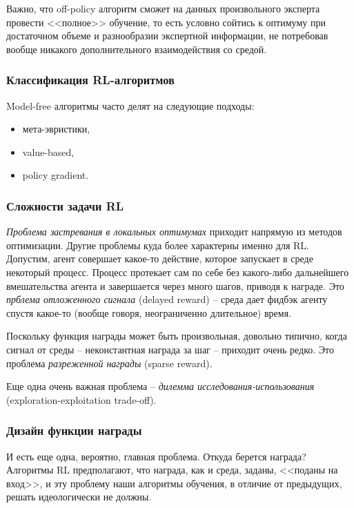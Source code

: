 \documentclass[%
	11pt,
	a4paper,
	utf8,
		]{article}
\begin{document}
Важно, что off-policy алгоритм сможет на данных произвольного эксперта провести <<полное>> обучение, то есть условно сойтись к оптимуму при достаточном объеме и разнообразии экспертной информации, не потребовав вообще никакого дополнительного взаимодействия со средой.

\subsubsection{Классификация RL-алгоритмов}

Model-free алгоритмы часто делят на следующие подходы:
\begin{itemize}
	\item мета-эвристики,
	
	\item value-based,
	
	\item policy gradient.
\end{itemize}

\subsubsection{Сложности задачи RL}

\emph{Проблема застревания в локальных оптимумах} приходит напрямую из методов оптимизации. Другие проблемы куда более характерны именно для RL. Допустим, агент совершает какое-то действие, которое запускает в среде некоторый процесс. Процесс протекает сам по себе без какого-либо дальнейшего вмешательства агента и завершается через много шагов, приводя к награде. Это \emph{прблема отложенного сигнала} (delayed reward) -- среда дает фидбэк агенту спустя какое-то (вообще говоря, неограниченно длительное) время.

Поскольку функция награды может быть произвольная, довольно типично, когда сигнал от среды -- неконстантная награда за шаг -- приходит очень редко. Это проблема \emph{разреженной награды} (sparse reward).

Еще одна очень важная проблема -- \emph{дилемма исследования-использования} (exploration-exploitation trade-off). 

\subsubsection{Дизайн функции награды}

И есть еще одна, вероятно, главная проблема. Откуда берется награда? Алгоритмы RL предполагают, что награда, как и среда, заданы, <<поданы на вход>>, и эту проблему наши алгоритмы обучения, в отличие от предыдущих, решать идеологически не должны.
\end{document}
